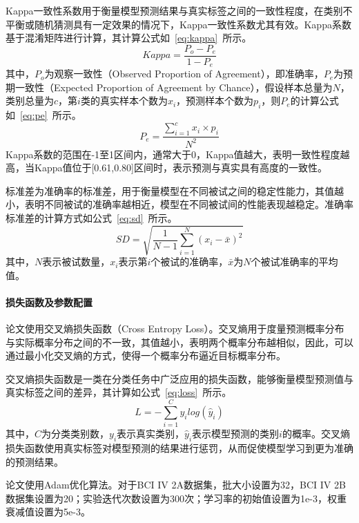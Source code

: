 Kappa一致性系数用于衡量模型预测结果与真实标签之间的一致性程度，在类别不平衡或随机猜测具有一定效果的情况下，Kappa一致性系数尤其有效。Kappa系数基于混淆矩阵进行计算，其计算公式如~\ref{eq:kappa}~所示。
\begin{equation}\label{eq:kappa}
    Kappa=\frac{P_o-P_e}{1-P_e}
\end{equation}
其中，\(P_o\)为观察一致性（Observed Proportion of Agreement），即准确率，\(P_e\)为预期一致性（Expected Proportion of Agreement by Chance），假设样本总量为\(N\)，类别总量为\(c\)，第\(i\)类的真实样本个数为\(x_i\)，预测样本个数为\(p_i\)，则\(P_e\)的计算公式如~\ref{eq:pe}~所示。
\begin{equation}\label{eq:pe}
    P_e=\frac{\sum_{i=1}^{c}x_i \times p_i }{N^{2} } 
\end{equation}
Kappa系数的范围在-1至1区间内，通常大于0，Kappa值越大，表明一致性程度越高，当Kappa值位于[0.61,0.80]区间时，表示预测与真实具有高度的一致性。

标准差为准确率的标准差，用于衡量模型在不同被试之间的稳定性能力，其值越小，表明不同被试的准确率越相近，模型在不同被试间的性能表现越稳定。准确率标准差的计算方式如公式~\ref{eq:sd}~所示。
\begin{equation}
    SD=\sqrt{\frac{1}{N-1}  \sum_{i=1}^{N}(x_i-\bar{x} )^{2} } 
    \label{eq:sd}
\end{equation}
其中，\(N\)表示被试数量，\(x_i\)表示第\(i\)个被试的准确率，\(\bar{x}\)为\(N\)个被试准确率的平均值。

\paragraph{损失函数及参数配置}

论文使用交叉熵损失函数（Cross Entropy Loss）。交叉熵用于度量预测概率分布与实际概率分布之间的不一致，其值越小，表明两个概率分布越相似，因此，可以通过最小化交叉熵的方式，使得一个概率分布逼近目标概率分布。

交叉熵损失函数是一类在分类任务中广泛应用的损失函数，能够衡量模型预测值与真实标签之间的差异，其计算如公式~\ref{eq:loss}~所示。
\begin{equation}
    L= -\sum_{i=1}^{C}y_i log(\hat{y}_i )
    \label{eq:loss}
\end{equation}
其中，\(C\)为分类类别数，\(y_i\)表示真实类别，\(\hat{y}_i\)表示模型预测的类别\(i\)的概率。交叉熵损失函数使用真实标签对模型预测的结果进行惩罚，从而促使模型学习到更为准确的预测结果。

论文使用Adam优化算法。对于BCI IV 2A数据集，批大小设置为32，BCI IV 2B数据集设置为20；实验迭代次数设置为300次；学习率的初始值设置为1e-3，权重衰减值设置为5e-3。


